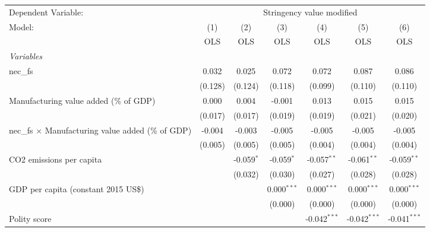 
\begingroup
\centering
\begin{tabular}{lcccccc}
   \toprule
   Dependent Variable: & \multicolumn{6}{c}{Stringency value modified}\\
   Model:                                                    & (1)     & (2)          & (3)           & (4)            & (5)            & (6)\\  
                                                             &  OLS    & OLS          & OLS           & OLS            & OLS            & OLS\\  
   \midrule
   \emph{Variables}\\
   nec\_fs                                                   & 0.032   & 0.025        & 0.072         & 0.072          & 0.087          & 0.086\\   
                                                             & (0.128) & (0.124)      & (0.118)       & (0.099)        & (0.110)        & (0.110)\\   
   Manufacturing value added (\% of GDP)                     & 0.000   & 0.004        & -0.001        & 0.013          & 0.015          & 0.015\\   
                                                             & (0.017) & (0.017)      & (0.019)       & (0.019)        & (0.021)        & (0.020)\\   
   nec\_fs $\times$ Manufacturing value added (\% of GDP)    & -0.004  & -0.003       & -0.005        & -0.005         & -0.005         & -0.005\\   
                                                             & (0.005) & (0.005)      & (0.005)       & (0.004)        & (0.004)        & (0.004)\\   
   CO2 emissions per capita                                  &         & -0.059$^{*}$ & -0.059$^{*}$  & -0.057$^{**}$  & -0.061$^{**}$  & -0.059$^{**}$\\   
                                                             &         & (0.032)      & (0.030)       & (0.027)        & (0.028)        & (0.028)\\   
   GDP per capita (constant 2015 US\$)                       &         &              & 0.000$^{***}$ & 0.000$^{***}$  & 0.000$^{***}$  & 0.000$^{***}$\\   
                                                             &         &              & (0.000)       & (0.000)        & (0.000)        & (0.000)\\   
   Polity score                                              &         &              &               & -0.042$^{***}$ & -0.042$^{***}$ & -0.041$^{***}$\\   

\end{tabular}
